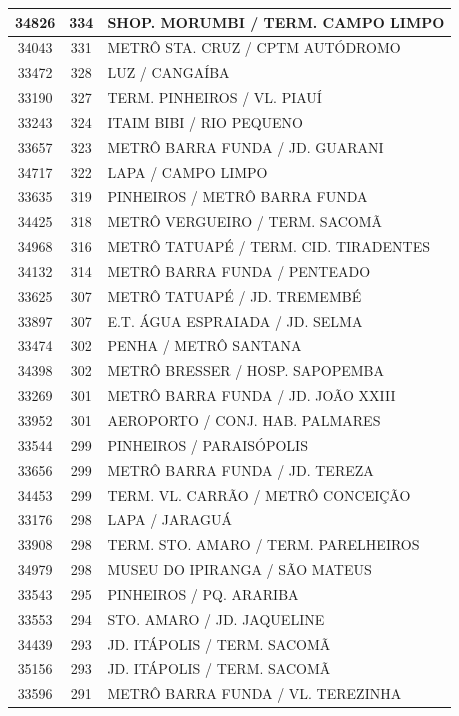 \documentclass[
	12pt,				%
	oneside,			%
	a4paper,			%
	english,			%
	brazil				%
	]{abntex2ppgsi}
\begin{document}
{{{\begin{apendicesenv}
\begin{longtable}{c|c|p{7cm}}
 \hline 
34826 &	334 &	SHOP. MORUMBI / TERM. CAMPO LIMPO \\ 
 \hline 
34043 &	331 &	METRÔ STA. CRUZ / CPTM AUTÓDROMO \\ 
 \hline 
33472 &	328 &	LUZ / CANGAÍBA \\ 
 \hline 
33190 &	327 &	TERM. PINHEIROS / VL. PIAUÍ \\ 
 \hline 
33243 &	324 &	ITAIM BIBI / RIO PEQUENO \\ 
 \hline 
33657 &	323 &	METRÔ BARRA FUNDA / JD. GUARANI \\ 
 \hline 
34717 &	322 &	LAPA / CAMPO LIMPO \\ 
 \hline 
33635 &	319 &	PINHEIROS / METRÔ BARRA FUNDA \\ 
 \hline 
34425 &	318 &	METRÔ VERGUEIRO / TERM. SACOMÃ \\ 
 \hline 
34968 &	316 &	METRÔ TATUAPÉ / TERM. CID. TIRADENTES \\ 
 \hline 
34132 &	314 &	METRÔ BARRA FUNDA / PENTEADO \\ 
 \hline 
33625 &	307 &	METRÔ TATUAPÉ / JD. TREMEMBÉ \\ 
 \hline 
33897 &	307 &	E.T. ÁGUA ESPRAIADA / JD. SELMA \\ 
 \hline 
33474 &	302 &	PENHA / METRÔ SANTANA \\ 
 \hline 
34398 &	302 &	METRÔ BRESSER / HOSP. SAPOPEMBA \\ 
 \hline 
33269 &	301 &	METRÔ BARRA FUNDA / JD. JOÃO XXIII \\ 
 \hline 
33952 &	301 &	AEROPORTO / CONJ. HAB. PALMARES \\ 
 \hline 
33544 &	299 &	PINHEIROS / PARAISÓPOLIS \\ 
 \hline 
33656 &	299 &	METRÔ BARRA FUNDA / JD. TEREZA \\ 
 \hline 
34453 &	299 &	TERM. VL. CARRÃO / METRÔ CONCEIÇÃO \\ 
 \hline 
33176 &	298 &	LAPA / JARAGUÁ \\ 
 \hline 
33908 &	298 &	TERM. STO. AMARO / TERM. PARELHEIROS \\ 
 \hline 
34979 &	298 &	MUSEU DO IPIRANGA / SÃO MATEUS \\ 
 \hline 
33543 &	295 &	PINHEIROS / PQ. ARARIBA \\ 
 \hline 
33553 &	294 &	STO. AMARO / JD. JAQUELINE \\ 
 \hline 
34439 &	293 &	JD. ITÁPOLIS / TERM. SACOMÃ \\ 
 \hline 
35156 &	293 &	JD. ITÁPOLIS / TERM. SACOMÃ \\ 
 \hline 
33596 &	291 &	METRÔ BARRA FUNDA / VL. TEREZINHA \\ 

\end{longtable}
\end{apendicesenv}}}}
\end{document}
